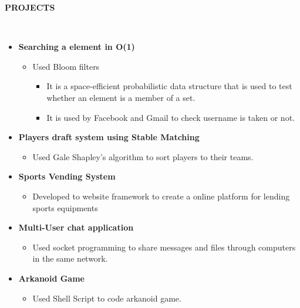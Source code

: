 \documentclass[a4paper,10pt]{article}
\newcommand{\isep}{-2 pt}
\newcommand{\lsep}{-0.5cm}
\newcommand{\resheading}[1]{{\small \colorbox{mygrey}{\begin{minipage}{0.975\textwidth}{\textbf{#1 \vphantom{p\^{E}}}}\end{minipage}}}}
\begin{document}
\resheading{\textbf{PROJECTS} }\\[\lsep]
\begin{itemize}

\item \textbf{Searching a element in O(1)
}  \\[-0.6cm]
	\begin{itemize}\itemsep \isep
	\item Used Bloom filters
	    \begin{itemize}\itemsep \isep
	    \item It is a space-efficient probabilistic data structure that is used to test whether an element is a member of a set.
	    \item It is used by Facebook and Gmail to check username is taken or not.
	    \end{itemize}
	\end{itemize}
	

\item \textbf{Players draft system using Stable Matching
}  \\[-0.6cm]
	\begin{itemize}\itemsep \isep
	\item Used Gale Shapley's algorithm to sort players to their teams.
	
	\end{itemize}
	\item \textbf{Sports Vending System
}  \\[-0.6cm]
	\begin{itemize}\itemsep \isep
	\item Developed to website framework to create a online platform for lending sports equipments
	
	\end{itemize}

\item \textbf{Multi-User chat application 
}  \\[-0.6cm]
	\begin{itemize}\itemsep \isep
	\item Used socket programming to share messages and files through computers in the same network.
	
	\end{itemize}
	
	

	
	\item \textbf{Arkanoid Game
}  \\[-0.6cm]
	\begin{itemize}\itemsep \isep
	\item Used Shell Script to code arkanoid game.
	
	\end{itemize}
	
	
	
	
	

	
\end{itemize}
\end{document}
